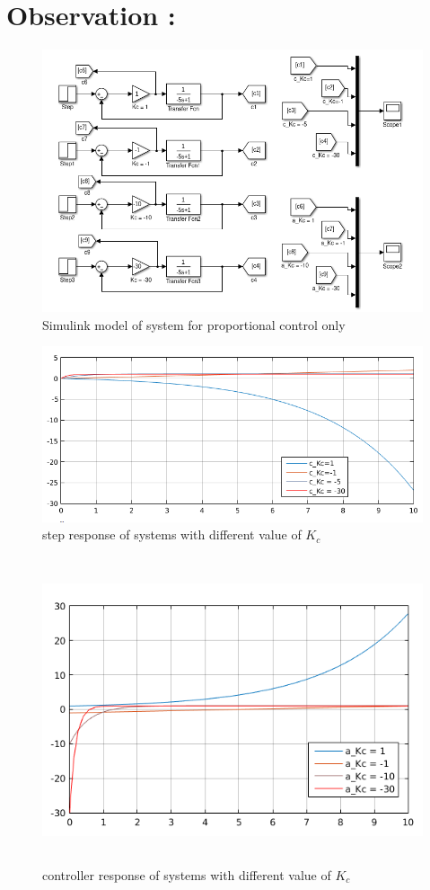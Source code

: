 \message{ !name(lab1.tex)}\documentclass[a4paper,12pt,openany]{book}
\begin{document}
\section{Observation : }
\begin{figure}[t]
  \centering
   \includegraphics[width = 175mm, scale =0.95]{lab06part10.png}
   \caption{Simulink model of system for proportional control only}
\end{figure}
 \begin{figure}[H]
   \includegraphics[width = 165mm,  scale = 0.95]{lab06part11.png}
   \caption{step response of systems with different value of $K_c$}
 \end{figure}
 \begin{figure}[H]
   \includegraphics[width = 165mm, height= 90mm, scale = 0.95]{lab06part12.png}
   \caption{controller response of systems with different value of $K_c$}
 \end{figure}
\end{document}
